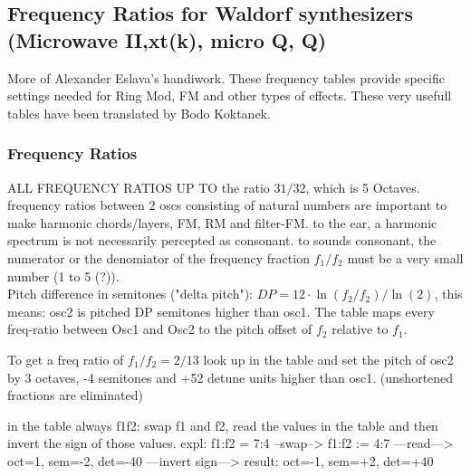 \subsection{Frequency Ratios for Waldorf synthesizers (Microwave II,xt(k), micro Q, Q)}
More of Alexander Eslava's handiwork. These frequency tables provide specific settings needed for Ring Mod, FM and other types of effects. These very usefull tables have been translated by Bodo Koktanek. 
\subsubsection{Frequency Ratios}
ALL FREQUENCY RATIOS UP TO the ratio $31/32$, which is 5 Octaves.\\
frequency ratios between 2 oscs consisting of natural numbers are important to make harmonic chords/layers, FM, RM and filter-FM.
to the ear, a harmonic spectrum is not necessarily percepted as consonant. to sounds consonant, the numerator or the denomiator of the frequency fraction $f_1/f_2$ must be a very small number (1 to 5 (?)). \\
Pitch difference in semitones ("delta pitch"): $DP = 12 \cdot \ln(f_2/f_2)/\ln(2)$, this means: osc2 is pitched DP semitones higher than osc1.
The table maps every freq-ratio between Osc1 and Osc2 to the pitch offset of $f_2$ relative to $f_1$.
\begin{example}
	To get a freq ratio of $f_1 / f_2 = 2 / 13$ look up in the table and set the pitch of osc2 by 3 octaves, -4 semitones and +52 detune units higher than osc1. (unshortened fractions are eliminated)
\end{example}
in the table always f1f2: swap f1 and f2, read the values in the table and then invert the sign of those values.
expl: f1:f2 = 7:4
--swap--> f1:f2 := 4:7
---read---> oct=1, sem=-2, det=-40
---invert sign---> result: oct=-1, sem=+2, det=+40

